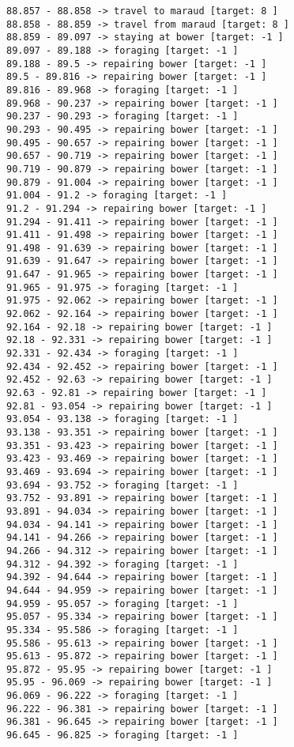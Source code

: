 \documentclass[11pt]{article}
\begin{document}
\begin{Verbatim}[commandchars=\\\{\}]
88.857 - 88.858 -> travel to maraud [target: 8 ]
88.858 - 88.859 -> travel from maraud [target: 8 ]
88.859 - 89.097 -> staying at bower [target: -1 ]
89.097 - 89.188 -> foraging [target: -1 ]
89.188 - 89.5 -> repairing bower [target: -1 ]
89.5 - 89.816 -> repairing bower [target: -1 ]
89.816 - 89.968 -> foraging [target: -1 ]
89.968 - 90.237 -> repairing bower [target: -1 ]
90.237 - 90.293 -> foraging [target: -1 ]
90.293 - 90.495 -> repairing bower [target: -1 ]
90.495 - 90.657 -> repairing bower [target: -1 ]
90.657 - 90.719 -> repairing bower [target: -1 ]
90.719 - 90.879 -> repairing bower [target: -1 ]
90.879 - 91.004 -> repairing bower [target: -1 ]
91.004 - 91.2 -> foraging [target: -1 ]
91.2 - 91.294 -> repairing bower [target: -1 ]
91.294 - 91.411 -> repairing bower [target: -1 ]
91.411 - 91.498 -> repairing bower [target: -1 ]
91.498 - 91.639 -> repairing bower [target: -1 ]
91.639 - 91.647 -> repairing bower [target: -1 ]
91.647 - 91.965 -> repairing bower [target: -1 ]
91.965 - 91.975 -> foraging [target: -1 ]
91.975 - 92.062 -> repairing bower [target: -1 ]
92.062 - 92.164 -> repairing bower [target: -1 ]
92.164 - 92.18 -> repairing bower [target: -1 ]
92.18 - 92.331 -> repairing bower [target: -1 ]
92.331 - 92.434 -> foraging [target: -1 ]
92.434 - 92.452 -> repairing bower [target: -1 ]
92.452 - 92.63 -> repairing bower [target: -1 ]
92.63 - 92.81 -> repairing bower [target: -1 ]
92.81 - 93.054 -> repairing bower [target: -1 ]
93.054 - 93.138 -> foraging [target: -1 ]
93.138 - 93.351 -> repairing bower [target: -1 ]
93.351 - 93.423 -> repairing bower [target: -1 ]
93.423 - 93.469 -> repairing bower [target: -1 ]
93.469 - 93.694 -> repairing bower [target: -1 ]
93.694 - 93.752 -> foraging [target: -1 ]
93.752 - 93.891 -> repairing bower [target: -1 ]
93.891 - 94.034 -> repairing bower [target: -1 ]
94.034 - 94.141 -> repairing bower [target: -1 ]
94.141 - 94.266 -> repairing bower [target: -1 ]
94.266 - 94.312 -> repairing bower [target: -1 ]
94.312 - 94.392 -> foraging [target: -1 ]
94.392 - 94.644 -> repairing bower [target: -1 ]
94.644 - 94.959 -> repairing bower [target: -1 ]
94.959 - 95.057 -> foraging [target: -1 ]
95.057 - 95.334 -> repairing bower [target: -1 ]
95.334 - 95.586 -> foraging [target: -1 ]
95.586 - 95.613 -> repairing bower [target: -1 ]
95.613 - 95.872 -> repairing bower [target: -1 ]
95.872 - 95.95 -> repairing bower [target: -1 ]
95.95 - 96.069 -> repairing bower [target: -1 ]
96.069 - 96.222 -> foraging [target: -1 ]
96.222 - 96.381 -> repairing bower [target: -1 ]
96.381 - 96.645 -> repairing bower [target: -1 ]
96.645 - 96.825 -> foraging [target: -1 ]

\end{Verbatim}
\end{document}
